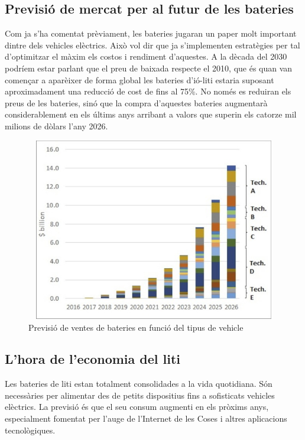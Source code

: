 \subsection{Previsió de mercat per al futur de les bateries}

Com ja s'ha comentat prèviament, les bateries jugaran un paper molt important dintre dels vehicles elèctrics. Això vol dir que ja s'implementen estratègies per tal d'optimitzar el màxim els costos i rendiment d'aquestes. A la dècada del 2030 podríem estar parlant que el preu de baixada respecte el 2010, que és quan van començar a aparèixer de forma global les bateries d'ió-liti estaria suposant aproximadament una reducció de cost de fins al 75\%. No només es reduiran els preus de les bateries, sinó que la compra \newline d'aquestes bateries augmentarà considerablement en els últims anys arribant a valors que superin els catorze mil milions de dòlars l'any 2026.
\begin{figure}[H]
		\centering
    	\includegraphics[width=13cm, height=8cm]{Marcteoric/ventabateries2026.jpg}
     	\caption{Previsió de ventes de bateries en funció del tipus de vehicle} 
\end{figure}

\subsection{L'hora de l'economia del liti}
Les bateries de liti estan totalment consolidades a la vida quotidiana. Són necessàries per alimentar des de petits dispositius fins a sofisticats vehicles elèctrics. La previsió és que el seu consum augmenti en els pròxims anys, especialment fomentat per l'auge de l'Internet de les Coses i altres aplicacions tecnològiques.

